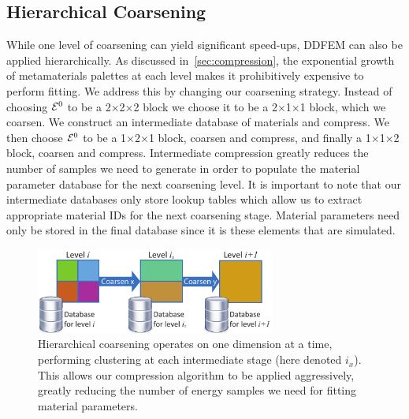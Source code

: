 \subsection{Hierarchical Coarsening}
While one level of coarsening can yield significant speed-ups, DDFEM can also be applied hierarchically.
As discussed in~\autoref{sec:compression}, the exponential growth of metamaterials palettes at each level makes it prohibitively expensive to perform fitting.
We address this by changing our coarsening strategy. 
Instead of choosing $\mathcal{E}^0$ to be a 2$\times$2$\times$2 block we choose it to be a 2$\times$1$\times$1 block, which we coarsen. We construct an intermediate database of materials and compress. 
We then choose $\mathcal{E}^0$ to be a 1$\times$2$\times$1 block, coarsen and compress, and finally a 1$\times$1$\times$2 block, coarsen and compress. Intermediate compression greatly reduces the number of samples we need to generate in order to populate the material parameter database for the next coarsening level. 
It is important to note that our intermediate databases only store lookup tables which allow us to extract appropriate material IDs for the next coarsening stage. Material parameters need only be stored in the final database since it is these elements that are simulated.
\begin{figure}
	\centering
	\includegraphics[width=0.7\textwidth]{images/hierchical}
	\caption{Hierarchical coarsening operates on one dimension at a time, performing clustering at each intermediate stage (here denoted $i_x$). This allows our compression algorithm to be applied aggressively, greatly reducing the number of energy samples we need for fitting material parameters. }
	\label{fig:hierarchy}
\end{figure}
